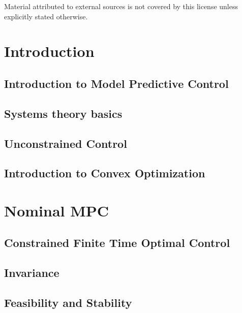 \documentclass[11pt,a4paper]{book}
\begin{document}
\medskip

\noindent\small
Material attributed to external sources is not covered by this license
unless explicitly stated otherwise.

\vspace*{\fill}

\clearpage
\tableofcontents
\newpage

\part{Introduction}

\chapter{Introduction to Model Predictive Control}

\newpage
\chapter{Systems theory basics}

\newpage
\chapter{Unconstrained Control}

\newpage
\chapter{Introduction to Convex Optimization}


\part{Nominal MPC}
\newpage
\chapter{Constrained Finite Time Optimal Control}


\newpage
\chapter{Invariance}


\newpage
\chapter{Feasibility and Stability}

\end{document}
